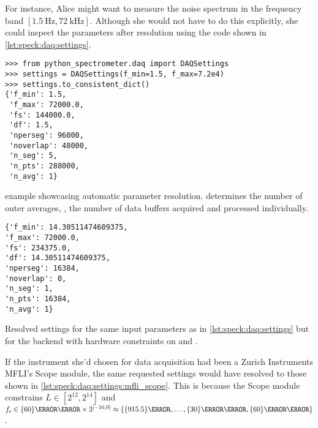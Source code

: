 For instance, Alice might want to measure the noise spectrum in the frequency band $[\qty{1.5}{\hertz}, \qty{72}{\kilo\hertz}]$.
Although she would not have to do this explicitly,
she could inspect the parameters after resolution using the code shown in \cref{lst:speck:daq:settings}.

\begin{listing}[htpb]
    \begin{verbatim}
>>> from python_spectrometer.daq import DAQSettings
>>> settings = DAQSettings(f_min=1.5, f_max=7.2e4)
>>> settings.to_consistent_dict()
{'f_min': 1.5,
 'f_max': 72000.0,
 'fs': 144000.0,
 'df': 1.5,
 'nperseg': 96000,
 'noverlap': 48000,
 'n_seg': 5,
 'n_pts': 288000,
 'n_avg': 1}
    \end{verbatim}
    \caption{
         example showcasing automatic parameter resolution.
         determines the number of outer averages, \ie, the number of data buffers acquired and processed individually.
    }
    \label{lst:speck:daq:settings}
\end{listing}

\begin{marginlisting}[-2.5cm]
    \begin{verbatim}
{'f_min': 14.30511474609375,
'f_max': 72000.0,
'fs': 234375.0,
'df': 14.30511474609375,
'nperseg': 16384,
'noverlap': 0,
'n_seg': 1,
'n_pts': 16384,
'n_avg': 1}
    \end{verbatim}
    \caption[Resolved  for MFLI Scope]{
        Resolved settings for the same input parameters as in \cref{lst:speck:daq:settings} but for the  backend with hardware constraints on  and .
    }
    \label{lst:speck:daq:settings:mfli_scope}
\end{marginlisting}

If the instrument she'd chosen for data acquisition had been a Zurich Instruments MFLI's Scope module,
the same requested settings would have resolved to those shown in \cref{lst:speck:daq:settings:mfli_scope}.
This is because the Scope module constrains $L\in[2^{12},2^{14}]$ and $\fs\in\qty{60}{\mega\hertz}\times 2^{[-16, 0]} \approx \allowbreak \lbrace \qty{915.5}{\hertz}, \allowbreak \dotsc, \allowbreak \qty{30}{\mega\hertz}, \qty{60}{\mega\hertz}\rbrace$.

